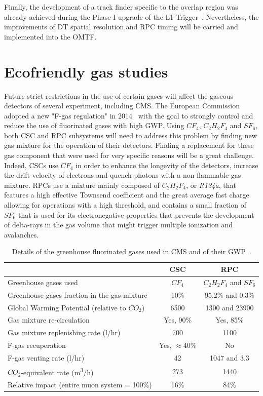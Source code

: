 	Finally, the development of a track finder specific to the overlap region was already achieved during the Phase-I upgrade of the L1-Trigger~\cite{L1UPGRADE2016}. Nevertheless, the improvements of DT spatial resolution and RPC timing will be carried and implemented into the OMTF.

\section{Ecofriendly gas studies}
\label{chapt3:sec:EcoGas}

	Future strict restrictions in the use of certain gases will affect the gaseous detectors of several experiment, including CMS. The European Commission adopted a new "F-gas regulation" in 2014~\cite{EUFGAS2014} with the goal to strongly control and reduce the use of fluorinated gases with high \acf{GWP}. Using $CF_4$, $C_2H_2F_4$ and $SF_6$, both CSC and RPC subsystems will need to address this problem by finding new gas mixture for the operation of their detectors. Finding a replacement for these gas component that were used for very specific reasons will be a great challenge. Indeed, CSCs use $CF_4$ in order to enhance the longevity of the detectors, increase the drift velocity of electrons and quench photons with a non-flammable gas mixture. RPCs use a mixture mainly composed of $C_2H_2F_4$, or \textit{R134a}, that features a high effective Townsend coefficient and the great average fast charge allowing for operations with a high threshold, and contains a small fraction of $SF_6$ that is used for its electronegative properties that prevents the development of delta-rays in the gas volume that might trigger multiple ionization and avalanches.
	
	\begin{table}[H]
		\centering
		\begin{tabular}{l c c}
			\hline
			 & CSC & RPC\\
			\hline
			Greenhouse gases used & $CF_4$ & $C_2H_2F_4$ and $SF_6$ \\
			Greenhouse gases fraction in the gas mixture & 10\% & 95.2\% and 0.3\% \\
			Global Warming Potential (relative to $CO_2$) & 6500 & 1300 and 23900 \\
			Gas mixture re-circulation & Yes, 90\% & Yes, 85\% \\
			Gas mixture replenishing rate (\si{l/hr}) & 700 & 1100 \\
			F-gas recuperation & Yes, $\approx$40\% & No \\
			F-gas venting rate (\si{l/hr}) & 42 & 1047 and 3.3 \\
			$CO_2$-equivalent rate (\si{m^3/h}) & 273 & 1440 \\
			Relative impact (entire muon system = 100\%) & 16\% & 84\% \\
			\hline
		\end{tabular}
		\caption{\label{tab:F-GAS-CMS} Details of the greenhouse fluorinated gases used in CMS and of their GWP~\cite{PHASEIITP}.}
	\end{table}
	
